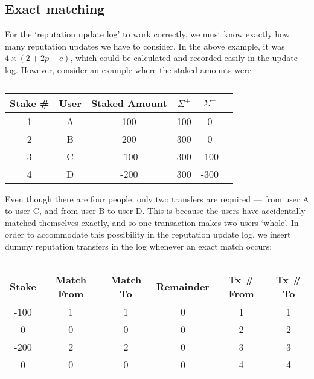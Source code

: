 \subsection{Exact matching}\label{sec:exactMatching}

For the `reputation update log' to work correctly, we must know exactly how many reputation updates we have to consider. In the above example, it was $4\times (2+2p+c)$, which could be calculated and recorded easily in the update log. However, consider an example where the staked amounts were

\begin{table}[ht]
\centering
\caption{}
\begin{tabular}{|c|c|c|c|c|c|}
\hline
Stake \# & User  & Staked Amount & $\Sigma^+$ & $\Sigma^-$ \\ \hline
1 & A & 100           & 100                      & 0                                                                       \\ \hline
2 & B & 200           & 300                      & 0                                                                       \\ \hline
3 & C & -100           & 300                      & -100                                                                       \\ \hline
4 & D & -200          & 300                      & -300                                                                    \\ \hline
\end{tabular}
\end{table}

Even though there are four people, only two transfers are required --- from user A to user C, and from user B to user D. This is because the users have accidentally matched themselves exactly, and so one transaction makes two users `whole'. In order to accommodate this possibility in the reputation update log, we insert dummy reputation transfers in the log whenever an exact match occurs:

\begin{table}[ht]
\centering
\caption{}
\begin{tabular}{|c|c|c|c|c|c|}
\hline
Stake & Match From & Match To & Remainder & Tx \# From & Tx \# To \\ \hline
-100  & 1          & 1        & 0   & 1 & 1     \\ \hline
 0 & 0          & 0        & 0      & 2 & 2   \\ \hline
-200 & 2          & 2        & 0    & 3 & 3    \\ \hline
 0 & 0          & 0        & 0      & 4 & 4   \\ \hline
\end{tabular}
\end{table}

